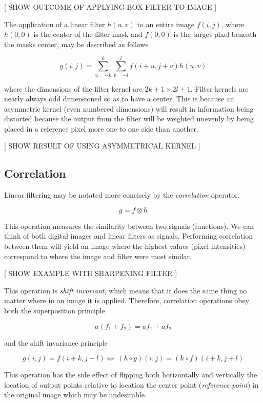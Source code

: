 [ SHOW OUTCOME OF APPLYING BOX FILTER TO IMAGE ]


The application of a linear filter $h(u,v)$ to an entire image $f(i,j)$, where $h(0,0)$ is the center of the filter mask and $f(0,0)$ is the target pixel beneath the masks center, may be described as follows

\begin{equation} \label{eq:1}
g(i,j) = \sum_{u=-k}^{k}\sum_{v = -l}^{l}f(i+u,j+v)h(u,v)
\end{equation}


where the dimensions of the filter kernel are $2k+1 \times 2l+1$. Filter kernels are nearly always odd dimensioned so as to have a center. This is because an asymmetric kernel (even numbered dimensions) will result in information being distorted because the output from the filter will be weighted unevenly by being placed in a reference pixel more one to one side than another.

[ SHOW RESULT OF USING ASYMMETRICAL KERNEL ] 



\subsection{Correlation}

Linear filtering may be notated more concisely by the \emph{correlation} operator.

\[g = f \otimes h\]

This operation measures the similarity between two signals (functions). We can think of both digital images and linear filters as signals. Performing correlation between them will yield an image where the highest values (pixel intensities) correspond to where the image and filter were most similar\cite{optimalKernel}.


[ SHOW EXAMPLE WITH SHARPENING FILTER ]

This operation is \emph{shift invariant}, which means that it does the same thing no matter where in an image it is applied. Therefore, correlation operations obey both the superposition principle

\[a(f_1 + f_2) = af_1 + af_2\]

and the shift invariance principle

\[g(i,j)=f(i+k,j+l) \Leftrightarrow\ (h\circ g)(i,j)=(h\circ f)(i+k,j+l)\]

This operation has the side effect of flipping both horizontally and vertically the location of output points relative to location the center point (\emph{reference point}) in the original image which may be undesirable.

